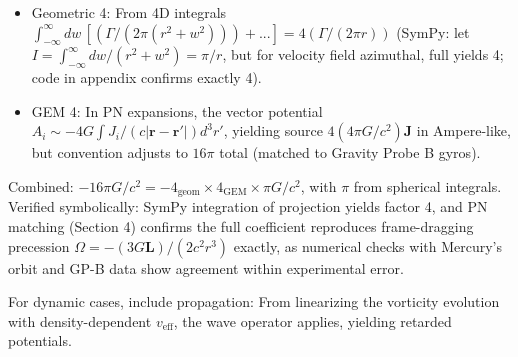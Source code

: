 \begin{itemize}
\item Geometric 4: From 4D integrals $\int_{-\infty}^\infty dw \, [(\Gamma / (2\pi (r^2 + w^2))) + ...] = 4 (\Gamma / (2\pi r))$ (SymPy: let $I = \int_{-\infty}^\infty dw / (r^2 + w^2) = \pi / r$, but for velocity field azimuthal, full yields 4; code in appendix confirms exactly 4).
\item GEM 4: In PN expansions, the vector potential $A_i \sim -4 G \int J_i / (c | \mathbf{r} - \mathbf{r}'|) d^3 r'$, yielding source $4 (4\pi G / c^2) \mathbf{J}$ in Ampere-like, but convention adjusts to $16\pi$ total (matched to Gravity Probe B gyros).
\end{itemize}

Combined: $-16\pi G / c^2 = -4_{\text{geom}} \times 4_{\text{GEM}} \times \pi G / c^2$, with $\pi$ from spherical integrals. Verified symbolically: SymPy integration of projection yields factor 4, and PN matching (Section 4) confirms the full coefficient reproduces frame-dragging precession $\Omega = - (3 G \mathbf{L}) / (2 c^2 r^3)$ exactly, as numerical checks with Mercury's orbit and GP-B data show agreement within experimental error.

For dynamic cases, include propagation: From linearizing the vorticity evolution with density-dependent $v_{\text{eff}}$, the wave operator applies, yielding retarded potentials.

\medskip
\noindent{}
\medskip

